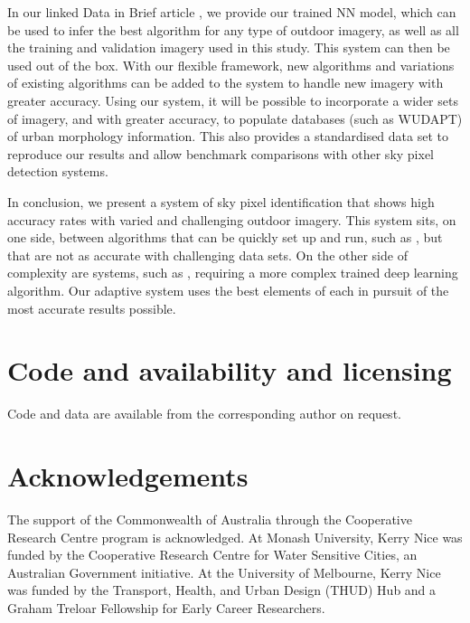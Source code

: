 \documentclass[final,3p,times,authoryear]{elsarticle}
\begin{document}
In our linked Data in Brief article \citep{Nice2019Data}, we provide our trained NN model, which can be used to infer the best algorithm for any type of outdoor imagery, as well as all the training and validation imagery used in this study. This system can then be used out of the box. With our flexible framework, new algorithms and variations of existing algorithms can be added to the system to handle new imagery with greater accuracy. Using our system, it will be possible to incorporate a wider sets of imagery, and with greater accuracy, to populate databases (such as WUDAPT) of urban morphology information. This also provides a standardised data set to reproduce our results and allow benchmark comparisons with other sky pixel detection systems.

In conclusion, we present a system of sky pixel identification that shows high accuracy rates with varied and challenging outdoor imagery. This system sits, on one side, between algorithms that can be quickly set up and run, such as \cite{Middel2018}, but that are not as accurate with challenging data sets. On the other side of complexity are systems, such as \cite{Gong2018}, requiring a more complex trained deep learning algorithm. Our adaptive system uses the best elements of each in pursuit of the most accurate results possible.




\section{Code and availability and licensing}\label{sec:available}
Code and data are available from the corresponding author on request.






\section*{Acknowledgements}
The support of the Commonwealth of Australia through the Cooperative Research Centre program is acknowledged. At Monash University, Kerry Nice was funded by the Cooperative Research Centre for Water Sensitive Cities, an Australian Government initiative. At the University of Melbourne, Kerry Nice was funded by the Transport, Health, and Urban Design (THUD) Hub and a Graham Treloar Fellowship for Early Career Researchers.
 
\end{document}
